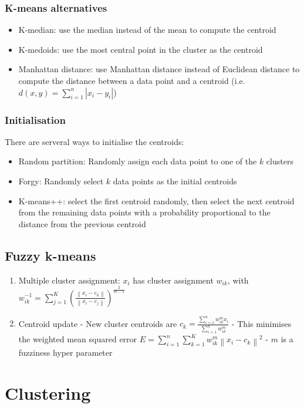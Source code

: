 \documentclass[12pt,a4paper]{article}
\begin{document}
\subsubsection{K-means alternatives}
\begin{itemize}
    \item K-median: use the median instead of the mean to compute the centroid
    \item K-medoids: use the most central point in the cluster as the centroid
    \item Manhattan distance: use Manhattan distance instead of Euclidean distance to compute the distance between a data point and a centroid (i.e. $d(x, y)=\sum_{i=1}^{n}\left|x_{i}-y_{i}\right|$)
\end{itemize}
\subsubsection{Initialisation}
There are serveral ways to initialise the centroids:
\begin{itemize}
    \item Random partition: Randomly assign each data point to one of the $k$ clusters
    \item Forgy: Randomly select $k$ data points as the initial centroids
    \item K-means++: select the first centroid randomly, then select the next centroid from the remaining data points with a probability proportional to the distance from the previous centroid
\end{itemize}

\subsection{Fuzzy k-means}
\begin{enumerate}
    \item Multiple cluster assignment: $x_i$ has cluster assignment $w_{i k}$, with $w_{i k}^{-1}=\sum_{j=1}^K\left(\frac{\left\|x_i-c_k\right\|}{\left\|x_i-c_j\right\|}\right)^{\frac{2}{m-1}}$
    \item Centroid update
- New cluster centroids are $c_k=\frac{\sum_{i=1}^n w_{i k}^m x_i}{\sum_{i=1}^n w_{i k}^m}$
- This minimises the weighted mean squared error $E=\sum_{i=1}^n \sum_{k=1}^K w_{i k}^m\left\|x_i-c_k\right\|^2$
- $m$ is a fuzziness hyper parameter
\end{enumerate}



\section{Clustering}
\end{document}
